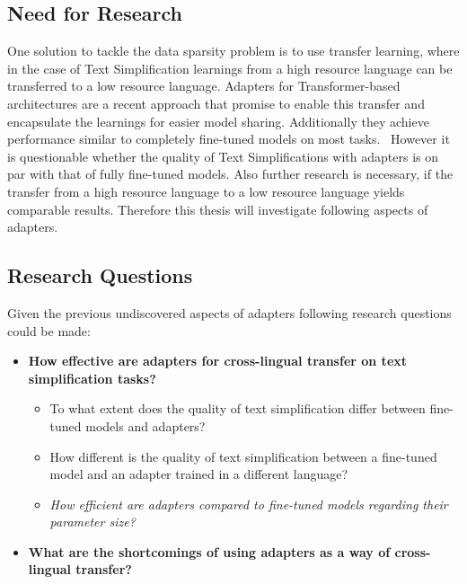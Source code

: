 \subsection{Need for Research}
One solution to tackle the data sparsity problem is to use transfer learning, where in the case of Text Simplification learnings from a high
resource language can be transferred to a low resource language. Adapters for Transformer-based architectures are a recent approach
that promise to enable this transfer and encapsulate the learnings for easier model sharing.
Additionally they achieve performance similar to completely fine-tuned models on most tasks.~\cite{Pfeiffer2020}
However it is questionable whether the quality of Text Simplifications with adapters is on par with that of fully fine-tuned models.
Also further research is necessary, if the transfer from a high resource language to a low resource language yields comparable results.
Therefore this thesis will investigate following aspects of adapters.

\subsection{Research Questions}
Given the previous undiscovered aspects of adapters following research questions could be made:

\begin{itemize}
    \item[] \textbf{How effective are adapters for cross-lingual transfer on text simplification tasks?}
    \begin{itemize}
        \item To what extent does the quality of text simplification differ between fine-tuned models and adapters?
        \item How different is the quality of text simplification between a fine-tuned model and an adapter trained in a different language?
        \item \emph{How efficient are adapters compared to fine-tuned models regarding their parameter size?}
    \end{itemize}
    \item[] \textbf{What are the shortcomings of using adapters as a way of cross-lingual transfer?}
\end{itemize}

